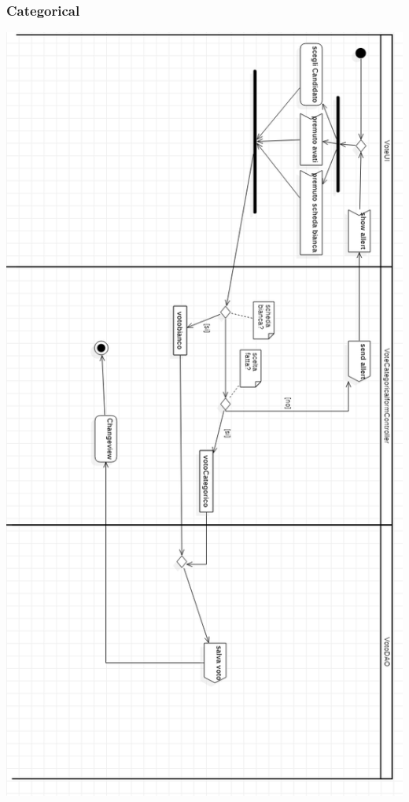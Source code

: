 \documentclass[11pt, oneside]{article}   	%
\begin{document}
\subsubsection{Categorical}
    \begin{center}
    \includegraphics[scale=0.5]{images/Categoricalactivity.png}
    \end{center}
    \pagebreak
    
\end{document}
